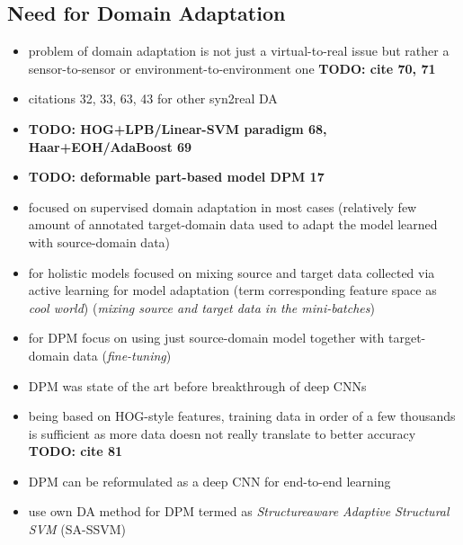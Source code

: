 \documentclass[]{article}
\newcommand{\todo}[1]{{\color{red}\bf{TODO: #1}}}
\begin{document}
\subsection{Need for Domain Adaptation}
\begin{itemize}
	\item problem of domain adaptation is not just a virtual-to-real issue but rather a sensor-to-sensor or environment-to-environment one \todo{cite 70, 71}
	\item citations 32, 33, 63, 43 for other syn2real DA
	\item \todo{HOG+LPB/Linear-SVM paradigm 68, Haar+EOH/AdaBoost 69}
	\item \todo{deformable part-based model DPM 17}
	\item focused on supervised domain adaptation in most cases (relatively few amount of annotated target-domain data used to adapt the model learned with source-domain data)
	\item for holistic models focused on mixing source and target data collected via active learning for model adaptation (term corresponding feature space as \textit{cool world}) (\textit{mixing source and target data in the mini-batches})
	\item for DPM focus on using just source-domain model together with target-domain data (\textit{fine-tuning})
	\item DPM was state of the art before breakthrough of deep CNNs
	\item being based on HOG-style features, training data in order of a few thousands is sufficient as more data doesn not really translate to better accuracy \todo{cite 81}
	\item DPM can be reformulated as a deep CNN for end-to-end learning
	\item use own DA method for DPM termed as \textit{Structureaware Adaptive Structural SVM} (SA-SSVM)
\end{itemize}
\end{document}
